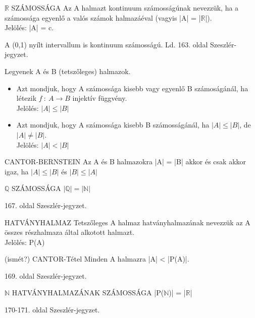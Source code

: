 \begin{definicio}{$\mathbb{R}$ SZÁMOSSÁGA}
Az A halmazt kontinuum számosságúnak nevezzük, ha a számossága egyenlő a valós számok halmazáéval (vagyis |A| = |$\mathbb{R}$|).\\
Jelölés: |A| = c.
\end{definicio}

A (0,1) nyílt intervallum is kontinuum számosságú. Ld. 163. oldal Szeszlér-jegyzet.

\begin{definicio}{}
Legyenek A és B (tetszőleges) halmazok.
\begin{itemize}
\item Azt mondjuk, hogy A számossága kisebb vagy egyenlő B számoságánál, ha létezik $f\::\:A \to B$ injektív függvény.\\
Jelölés: $|A| \leq |B|$
\item Azt mondjuk, hogy A számossága kisebb B számosságánál, ha $|A| \leq |B|$, de $|A| \neq |B|$.\\
Jelölés: $|A| < |B|$
\end{itemize}
\end{definicio}

\begin{tetel}{CANTOR-BERNSTEIN}
Az A és B halmazokra |A| = |B| akkor és csak akkor igaz, ha $|A| \leq |B|$ és $|B| \leq |A|$
\end{tetel}

\begin{tetel}{$\mathbb{Q}$ SZÁMOSSÁGA}
$|\mathbb{Q}| = |\mathbb{N}|$
\end{tetel}

\begin{bizonyitas}{}
167. oldal Szeszlér-jegyzet.
\end{bizonyitas}

\begin{definicio}{HATVÁNYHALMAZ}
Tetszőleges A halmaz hatványhalmazának nevezzük az A összes részhalmaza által alkotott halmazt.\\
Jelölés: P(A)
\end{definicio}

\begin{tetel}{(ismét?) CANTOR-Tétel}
Minden A halmazra |A| < |P(A)|.
\end{tetel}

\begin{bizonyitas}{}
169. oldal Szeszlér-jegyzet.
\end{bizonyitas}

\begin{tetel}{$\mathbb{N}$ HATVÁNYHALMAZÁNAK SZÁMOSSÁGA}
|P($\mathbb{N}$)| = |$\mathbb{R}$|
\end{tetel}

\begin{bizonyitas}{}
170-171. oldal Szeszlér-jegyzet.
\end{bizonyitas}

